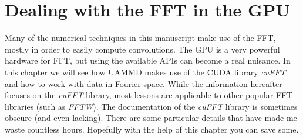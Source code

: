 \documentclass[twoside,openright,titlepage,numbers=noenddot,%
headinclude,footinclude,cleardoublepage=empty,abstract=on,
BCOR=5mm,fontsize=11pt, dvipsnames, paper=b5
]{scrreprt}
\def\ucpp{uammd_cpp_lexer.py:UAMMDCppLexer -x}
\newcommand{\uammd}{\gls{UAMMD}\xspace}
\newcommand{\gpu}{\gls{GPU}\xspace}
\begin{document}
%    



\chapter{Dealing with the FFT in the GPU} \label{ch:appendixa}

Many of the numerical techniques in this manuscript make use of the \gls{FFT}, mostly in order to easily compute convolutions. The \gpu is a very powerful hardware for \gls{FFT}, but using the available \glspl{API} can become a real nuisance. In this chapter we will see how \uammd makes use of the CUDA library \emph{cuFFT}~\cite{cufft} and how to work with data in Fourier space. While the information hereafter focuses on the \emph{cuFFT} library, most lessons are applicable to other popular \gls{FFT} libraries (such as \emph{FFTW}).
The documentation of the \emph{cuFFT} library is sometimes obscure (and even lacking). There are some particular details that have made me waste countless hours. Hopefully with the help of this chapter you can save some.
\end{document}
